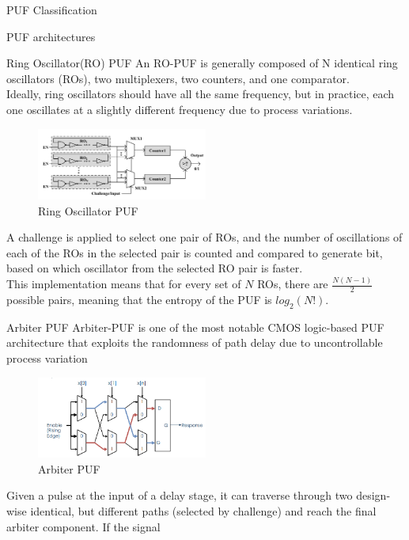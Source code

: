 \begin{section}{PUF Classification}
\begin{subsection}{PUF architectures}
  \begin{subsubsection}{Ring Oscillator(RO) PUF}
    An RO-PUF is generally composed of N identical ring oscillators (ROs), two multiplexers, two
    counters, and one comparator.\\
    Ideally, ring oscillators should have all the same frequency, but in practice, each one 
    oscillates at a slightly different frequency due to process variations.
    \begin{figure}[h]
      \centering
      \includegraphics[width=0.5\textwidth]{img/hardware/RO PUF.png}
      \caption{Ring Oscillator PUF}
    \end{figure}
    A challenge is applied to select one pair of ROs, and the number of oscillations of each of the
    ROs in the selected pair is counted and compared to generate bit, based on which
    oscillator from the selected RO pair is faster.\\
    This implementation means that for every set of $N$ ROs, there are $\frac{N(N-1)}{2}$ possible
    pairs, meaning that the entropy of the PUF is $log_2(N!)$.
  \end{subsubsection}
  \begin{subsubsection}{Arbiter PUF}
    Arbiter-PUF is one of the most notable CMOS logic-based PUF architecture that exploits the
    randomness of path delay due to uncontrollable process variation
    \begin{figure}[h]
      \centering
      \includegraphics[width=0.5\textwidth]{img/hardware/arbiter puf.png}
      \caption{Arbiter PUF}
    \end{figure}
    Given a pulse at the input of a delay stage, it can traverse through two design-wise identical,
    but different paths (selected by challenge) and reach the final arbiter component. If the signal

\end{subsubsection}
\end{subsection}
\end{section}
